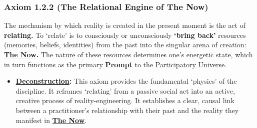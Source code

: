 \documentclass{article}
\begin{document}
\subsubsection*{Axiom 1.2.2 (The Relational Engine of \textbf{The Now})} 
The mechanism by which reality is created in the present moment is the act of \textbf{relating.} To `relate' is to consciously or unconsciously \textbf{`bring back'} resources (memories, beliefs, identities) from the past into the singular arena of creation: \textbf{\hyperlink{gloss:the_now}{The Now}.} The nature of these resources determines one's energetic state, which in turn functions as the primary \textbf{\hyperlink{gloss:prompt}{Prompt}} to the \hyperlink{gloss:participatory_universe}{Participatory Universe}.
\begin{itemize}
    \item \textbf{\hyperlink{gloss:deconstruction}{Deconstruction}:} This axiom provides the fundamental `physics' of the discipline. It reframes `relating' from a passive social act into an active, creative process of reality-engineering. It establishes a clear, causal link between a practitioner's relationship with their past and the reality they manifest in \textbf{\hyperlink{gloss:the_now}{The Now}}.
\end{itemize}
\end{document}
